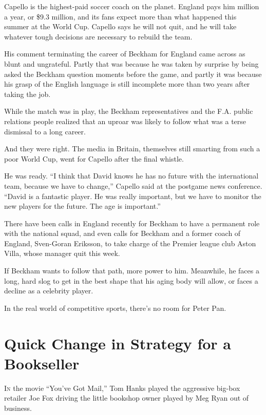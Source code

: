 ﻿\documentclass[12pt]{article}
\begin{document}
Capello is the highest-paid soccer coach on the planet. England pays him  million a
year, or \$9.3 million, and its fans expect more than what happened this summer at the World Cup.
Capello says he will not quit, and he will take whatever tough decisions are necessary to rebuild
the team.

His comment terminating the career of Beckham for England came across as blunt and ungrateful.
Partly that was because he was taken by surprise by being asked the Beckham question moments before
the game, and partly it was because his grasp of the English language is still incomplete more than
two years after taking the job.

While the match was in play, the Beckham representatives and the F.A. public relations people
realized that an uproar was likely to follow what was a terse dismissal to a long career.

And they were right. The media in Britain, themselves still smarting from such a poor World Cup,
went for Capello after the final whistle.

He was ready. ``I think that David knows he has no future with the international team, because we
have to change,'' Capello said at the postgame news conference. ``David is a fantastic player. He
was really important, but we have to monitor the new players for the future. The age is important.''

There have been calls in England recently for Beckham to have a permanent role with the national
squad, and even calls for Beckham and a former coach of England, Sven-Goran Eriksson, to take charge
of the Premier league club Aston Villa, whose manager quit this week.

If Beckham wants to follow that path, more power to him. Meanwhile, he faces a long, hard slog to
get in the best shape that his aging body will allow, or faces a decline as a celebrity player.

In the real world of competitive sports, there's no room for Peter Pan.

\section{Quick Change in Strategy for a Bookseller}

\lettrine{I}{n} the movie ``You've Got Mail,'' Tom Hanks played the
aggressive big-box retailer Joe Fox driving the little bookshop owner played by Meg Ryan out of
business.
\end{document}
